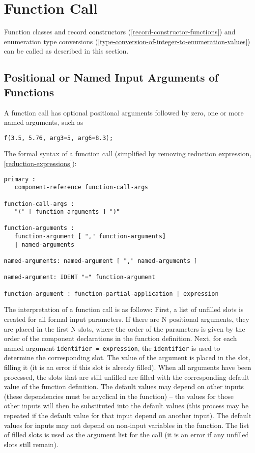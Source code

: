 \section{Function Call}

Function classes and record constructors (\autoref{record-constructor-functions}) and enumeration type
conversions (\autoref{type-conversion-of-integer-to-enumeration-values}) can be called as described in this section.

\subsection{Positional or Named Input Arguments of Functions}

A function call has optional positional arguments followed by zero, one
or more named arguments, such as

\begin{lstlisting}[language=modelica]
f(3.5, 5.76, arg3=5, arg6=8.3);
\end{lstlisting}

The formal syntax of a function call (simplified by removing reduction
expression, \autoref{reduction-expressions}):
\begin{lstlisting}[language=grammar]
primary :
   component-reference function-call-args

function-call-args :
   "(" [ function-arguments ] ")"

function-arguments :
   function-argument [ "," function-arguments]
   | named-arguments

named-arguments: named-argument [ "," named-arguments ]

named-argument: IDENT "=" function-argument

function-argument : function-partial-application | expression
\end{lstlisting}

The interpretation of a function call is as follows: First, a list of
unfilled slots is created for all formal input parameters. If there are
N positional arguments, they are placed in the first N slots, where the
order of the parameters is given by the order of the component
declarations in the function definition. Next, for each named argument
\lstinline!identifier = expression!, the \lstinline!identifier! is used to determine the
corresponding slot.  The value of the argument is placed in the slot,
filling it (it is an error if this slot is already filled).  When all arguments have been processed, the slots that are
still unfilled are filled with the corresponding default value of the
function definition. The default values may depend on other inputs
(these dependencies must be acyclical in the function) -- the values for
those other inputs will then be substituted into the default values
(this process may be repeated if the default value for that input depend
on another input). The default values for inputs may not depend on
non-input variables in the function.  The list of filled slots is used as the argument list for the call (it is an error if any unfilled slots still remain).


